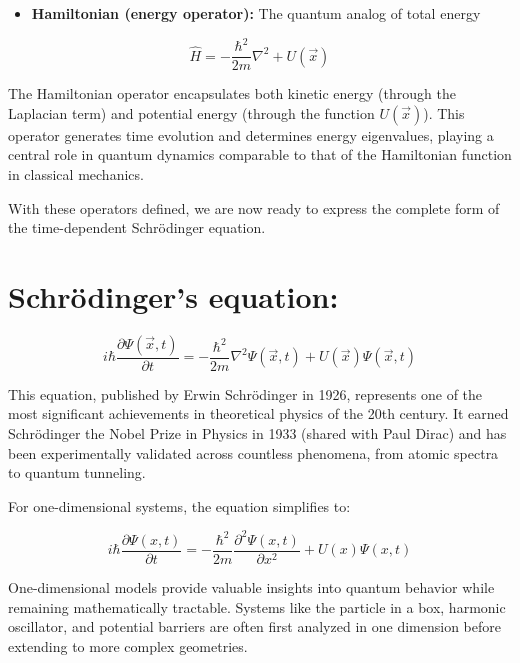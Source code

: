 \begin{itemize}
  \item \textbf{Hamiltonian (energy operator):} The quantum analog of total energy
\end{itemize}

\begin{equation}
\hat{H}=-\frac{\hbar^{2}}{2 m} \nabla^{2}+U(\vec{x})
\end{equation}

The Hamiltonian operator encapsulates both kinetic energy (through the Laplacian term) and potential energy (through the function $U(\vec{x})$). This operator generates time evolution and determines energy eigenvalues, playing a central role in quantum dynamics comparable to that of the Hamiltonian function in classical mechanics.

With these operators defined, we are now ready to express the complete form of the time-dependent Schrödinger equation.

\section{Schrödinger's equation:}

\begin{equation}
i \hbar \frac{\partial \Psi(\vec{x}, t)}{\partial t}=-\frac{\hbar^{2}}{2 m} \nabla^{2} \Psi(\vec{x}, t)+U(\vec{x}) \Psi(\vec{x}, t)
\end{equation}

This equation, published by Erwin Schrödinger in 1926, represents one of the most significant achievements in theoretical physics of the 20th century. It earned Schrödinger the Nobel Prize in Physics in 1933 (shared with Paul Dirac) and has been experimentally validated across countless phenomena, from atomic spectra to quantum tunneling.

For one-dimensional systems, the equation simplifies to:

\begin{equation}
i \hbar \frac{\partial \Psi(x, t)}{\partial t}=-\frac{\hbar^{2}}{2 m} \frac{\partial^{2} \Psi(x, t)}{\partial x^{2}}+U(x) \Psi(x, t)
\end{equation}

One-dimensional models provide valuable insights into quantum behavior while remaining mathematically tractable. Systems like the particle in a box, harmonic oscillator, and potential barriers are often first analyzed in one dimension before extending to more complex geometries.

